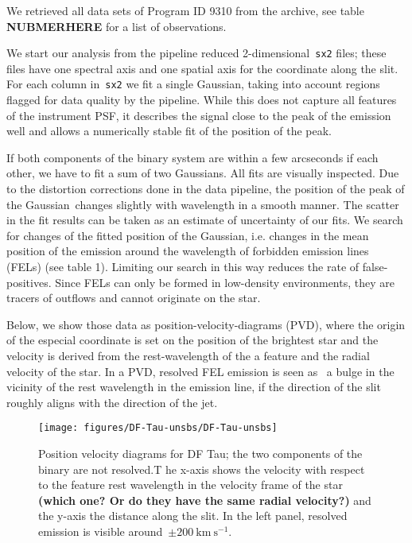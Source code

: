 \documentclass[twocolumn]{aastex62}
\begin{document}
We retrieved all data sets of Program ID 9310 from the archive, see
table \textbf{NUBMERHERE} for a list of observations.

We start our analysis from the pipeline reduced
2-dimensional~\texttt{sx2} files; these files have one spectral axis and
one spatial axis for the coordinate along the slit. For each column
in~\texttt{sx2} we fit a single Gaussian, taking into account regions
flagged for data quality by the pipeline. While this does not capture
all features of the instrument PSF, it describes the signal close to the
peak of the emission well and allows a numerically stable fit of the
position of the peak.

If both components of the binary system are within a few arcseconds if
each other, we have to fit a sum of two Gaussians. All fits are
visually inspected. Due to the distortion corrections done in the data
pipeline, the position of the peak of the Gaussian~changes slightly with
wavelength in a smooth manner. The scatter in the fit results can be
taken as an estimate of uncertainty of our fits. We search for changes
of the fitted position of the Gaussian, i.e. changes in the mean
position of the emission around the wavelength of forbidden emission
lines (FELs) (see table 1). Limiting our search in this way reduces the
rate of false-positives. Since FELs can only be formed in low-density
environments, they are tracers of outflows and cannot originate on the
star.

Below, we show those data as position-velocity-diagrams (PVD), where the
origin of the especial coordinate is set on the position of the
brightest star and the velocity is derived from the rest-wavelength of
the a feature and the radial velocity of the star. In a PVD, resolved
FEL emission is seen as~ a bulge in the vicinity of the rest wavelength
in the emission line, if the direction of the slit roughly aligns with
the direction of the jet.

\begin{figure}[h!]
\begin{center}
\texttt{[image: figures/DF-Tau-unsbs/DF-Tau-unsbs]}
\caption{{Position velocity diagrams for DF Tau; the two components of the binary
are not resolved.T he x-axis shows the velocity with respect to the
feature rest wavelength in the velocity frame of the star \textbf{(which
one? Or do they have the same radial velocity?)} and the y-axis the
distance along the slit. In the left panel, resolved emission is visible
around~\(\pm200\ \mathrm{km\ s^{-1}}\).
\label{fig:DFTau}
}}
\end{center}
\end{figure}
\end{document}
